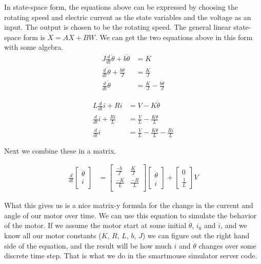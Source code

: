 \documentclass{article}
\begin{document}
In state-space form, the equations above can be expressed by choosing the rotating speed and electric current as the state variables and the voltage as an input. The output is chosen to be the rotating speed. The general linear state-space form is $\dot{X} = AX + BW$. We can get the two equations above in this form with some algebra.
\begin{align}
  J\frac{d}{dt}\dot{\theta} + b\dot{\theta} &= K \\
  \frac{d}{dt}\dot{\theta} + \frac{b\dot{\theta}}{J} &= \frac{K}{J} \\
  \frac{d}{dt}\dot{\theta} &= \frac{K}{J} - \frac{b\dot{\theta}}{J}
\end{align}

\begin{align}
  L\frac{d}{dt}i + Ri &= V - K\dot{\theta} \\
  \frac{d}{dt}i + \frac{Ri}{L} &= \frac{V}{L} - \frac{K\dot{\theta}}{L} \\
  \frac{d}{dt}i &= \frac{V}{L} - \frac{K\dot{\theta}}{L} - \frac{Ri}{L}
\end{align}

Next we combine these in a matrix.

\begin{align}
  \frac{d}{dt}\begin{bmatrix}\dot{\theta}\\i\\\end{bmatrix} &=
    \begin{bmatrix}
      \frac{-b}{J} & \frac{K}{J} \\
      \frac{-K}{L} & \frac{-R}{L} \\
    \end{bmatrix}
    \begin{bmatrix}
      \dot{\theta} \\
      i
    \end{bmatrix}
    +
    \begin{bmatrix}
      0 \\
      \frac{1}{L}
    \end{bmatrix}
    V
\end{align}

What this gives us is a nice matrix-y formula for the change in the current and angle of our motor over time. We can use this equation to simulate the behavior of the motor. If we assume the motor start at some initial $\dot{\theta}$, $i_0$ and $\dot{i}$, and we know all our motor constants ($K$, $R$, $L$, $b$, $J$) we can figure out the right hand side of the equation, and the result will be how much $i$ and $\dot{\theta}$ changes over some discrete time step. That is what we do in the smartmouse simulator server code.
\end{document}
